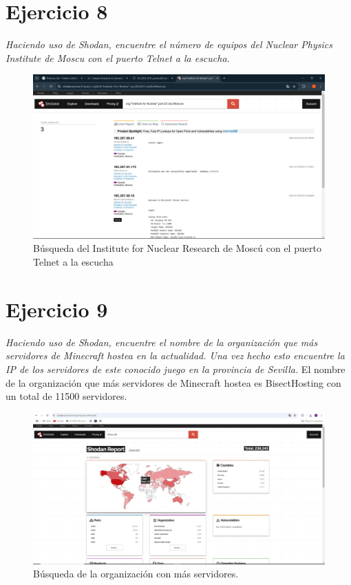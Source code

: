 \documentclass[12pt]{book}
\begin{document}
\section{Ejercicio 8}
\textit{Haciendo uso de Shodan, encuentre el número de equipos del Nuclear Physics Institute de Moscu con el puerto Telnet a la escucha.}
\begin{figure}[h]
    \centering
    \includegraphics[width=\linewidth]{Practica 3y4/images/Captura de pantalla (93).png}
    \caption{Búsqueda del Institute for Nuclear Research de Moscú con el puerto Telnet a la escucha}
    \label{fig:enter-label}
\end{figure}

\section{Ejercicio 9}
\textit{Haciendo uso de Shodan, encuentre el nombre de la organización que más servidores de Minecraft hostea en la actualidad. Una vez hecho esto encuentre la IP de los servidores de este conocido juego en la provincia de Sevilla.}
\newline
El nombre de la organización que más servidores de Minecraft hostea es BisectHosting con un total de 11500 servidores.
\begin{figure}[h]
    \centering
    \includegraphics[width=.7\linewidth]{Practica 3y4/images/WhatsApp Image 2024-10-24 at 10.48.04.jpeg}
    \caption{Búsqueda de la organización con más servidores.}
    \label{fig:enter-label}
\end{figure}
\end{document}
